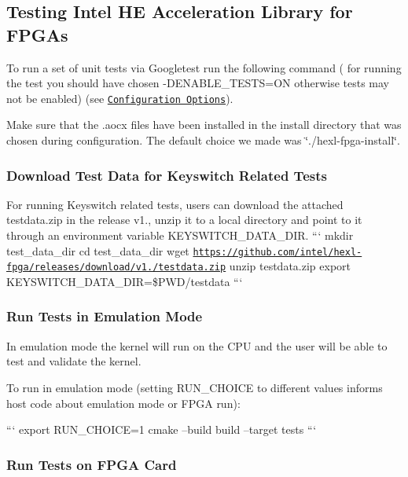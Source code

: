 \subsection*{Testing Intel H\-E Acceleration Library for F\-P\-G\-As}

To run a set of unit tests via Googletest run the following command ( for running the test you should have chosen {\ttfamily -\/\-D\-E\-N\-A\-B\-L\-E\-\_\-\-T\-E\-S\-T\-S=O\-N} otherwise tests may not be enabled) (see \href{#configuration-options}{\tt Configuration Options}). \par
 Make sure that the .aocx files have been installed in the install directory that was chosen during configuration. The default choice we made was \char`\"{}./hexl-\/fpga-\/install\char`\"{}. \par


\subsubsection*{Download Test Data for Keyswitch Related Tests}

For running Keyswitch related tests, users can download the attached testdata.\-zip in the release v1., unzip it to a local directory and point to it through an environment variable K\-E\-Y\-S\-W\-I\-T\-C\-H\-\_\-\-D\-A\-T\-A\-\_\-\-D\-I\-R. ``` mkdir test\-\_\-data\-\_\-dir cd test\-\_\-data\-\_\-dir wget \href{https://github.com/intel/hexl-fpga/releases/download/v1.1/testdata.zip}{\tt https\-://github.\-com/intel/hexl-\/fpga/releases/download/v1./testdata.\-zip} unzip testdata.\-zip export K\-E\-Y\-S\-W\-I\-T\-C\-H\-\_\-\-D\-A\-T\-A\-\_\-\-D\-I\-R=\$\-P\-W\-D/testdata ```

\subsubsection*{Run Tests in Emulation Mode}

In emulation mode the kernel will run on the C\-P\-U and the user will be able to test and validate the kernel. \par
 To run in emulation mode (setting R\-U\-N\-\_\-\-C\-H\-O\-I\-C\-E to different values informs host code about emulation mode or F\-P\-G\-A run)\-: \par


``` export R\-U\-N\-\_\-\-C\-H\-O\-I\-C\-E=1 cmake --build build --target tests ```

\subsubsection*{Run Tests on F\-P\-G\-A Card}


